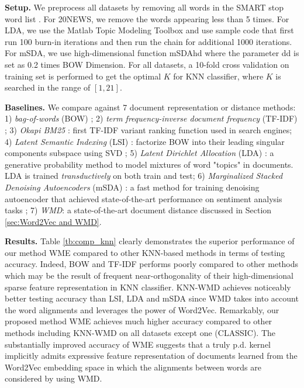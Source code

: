 \documentclass[11pt,a4paper]{article}
\newcommand{\1}{\boldsymbol{1}}
\begin{document}
\textbf{Setup.} We preprocess all datasets by removing all words in the SMART stop word list \cite{buckley1995automatic}. For 20NEWS, we remove the words appearing less than 5 times. For LDA, we use the Matlab Topic Modeling Toolbox \cite{griffiths2007probabilistic} and use sample code that first run 100 burn-in iterations and then run the chain for additional 1000 iterations. 
For mSDA, we use high-dimensional function mSDAhd where the parameter dd is set as 0.2 times BOW Dimension. For all datasets, a 10-fold cross validation on training set is performed to get the optimal $K$ for KNN classifier, where $K$ is searched in the range of $[1, 21]$. 

\textbf{Baselines.} We compare against 7 document representation or distance methods: 1) \emph{bag-of-words} (BOW) \cite{salton1988term}; 2) \emph{term frequency-inverse document frequency} (TF-IDF) \cite{robertson1994some}; 3) \emph{Okapi BM25} \cite{robertson1995okapi}: first TF-IDF variant ranking function used in search engines; 4) \emph{Latent Semantic Indexing} (LSI) \cite{deerwester1990indexing}: factorize BOW into their leading singular components subspace using SVD \cite{wu2015preconditioned,wu2017primme_svds}; 5) \emph{Latent Dirichlet Allocation} (LDA) \cite{blei2003latent}: a generative probability method to model mixtures of word "topics" in documents. LDA is trained \emph{transductively} on both train and test; 6) \emph{Marginalized Stacked Denoising Autoencoders} (mSDA) \cite{chen2012marginalized}: a fast method for training denoising autoencoder that achieved state-of-the-art performance on sentiment analysis tasks \cite{glorot2011domain}; 7) \emph{WMD}: a state-of-the-art document distance discussed in Section \ref{sec:Word2Vec and WMD}.  

\textbf{Results.} Table \ref{tb:comp_knn} clearly demonstrates the superior performance of our method WME compared to other KNN-based methods in terms of testing accuracy. Indeed, BOW and TF-IDF performs poorly compared to other methods which may be the result of frequent near-orthogonality of their high-dimensional sparse feature representation in KNN classifier. KNN-WMD achieves noticeably better testing accuracy than LSI, LDA and mSDA since WMD takes into account the word alignments and leverages the power of Word2Vec. Remarkably, our proposed method WME achieves much higher accuracy compared to other methods including KNN-WMD on all datasets except one (CLASSIC). The substantially improved accuracy of WME suggests that a truly p.d. kernel implicitly admits expressive feature representation of documents learned from the Word2Vec embedding space in which the alignments between words are considered by using WMD.
\end{document}
